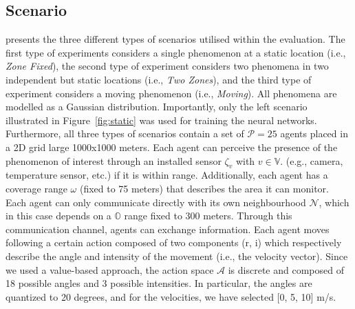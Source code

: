 \documentclass[conference]{IEEEtran}
\begin{document}
\subsection{Scenario}
 presents the three different types of scenarios utilised within the evaluation. The first type of experiments considers a single phenomenon at a static location (i.e., \emph{Zone Fixed}), the second type of experiment considers two phenomena in two independent but static locations (i.e., \emph{Two Zones}), and the third type of experiment considers a moving phenomenon (i.e., \emph{Moving}). All phenomena are modelled as a Gaussian distribution. Importantly, only the left scenario illustrated in Figure~\ref{fig:static} was used for training the neural networks. 
Furthermore, all three types of scenarios contain a set of $\mathcal{P} = 25$ agents placed in a 2D grid large 1000x1000 meters. %
Each agent can perceive the presence
 of the phenomenon of interest through an installed sensor $\zeta_v$ with $v \in \mathbb{V}$. 
 (e.g., camera, temperature sensor, etc.) if it is within range.
%
Additionally, each agent has a coverage range $\omega$ (fixed to 75 meters) 
 that describes the area it can monitor. 
 Each agent can only communicate directly with its own neighbourhood $\mathcal{N}$, 
 which in this case depends on a $\mathbb{O}$ range fixed to 300 meters. %
Through this communication channel, agents can exchange information. 
%
Each agent moves following a certain action composed of two components (r, i) 
 which respectively describe the angle and intensity of the movement (i.e., the velocity vector).
Since we used a value-based approach, 
 the action space $\mathcal{A}$ is discrete and composed of 18 possible angles and 3 possible intensities.
In particular, the angles are quantized to 20 degrees, and for the velocities, we have selected [0, 5, 10] m/s.
%
\end{document}
